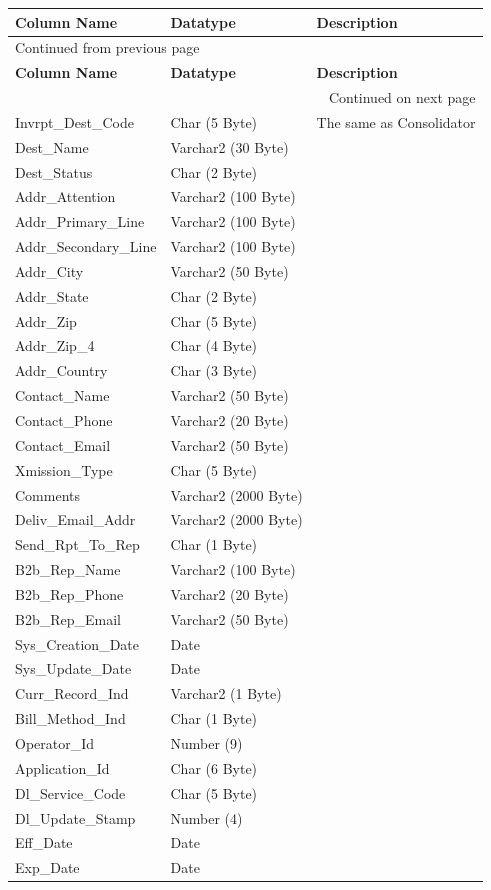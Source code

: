 \documentclass[12pt,twoside]{article}
\begin{document}
\begin{longtable}{l|l|l}
\hline
\textbf{Column Name} & \textbf{Datatype} & \textbf{Description}\\
\hline
\endfirsthead
\multicolumn{3}{l}{Continued from previous page} \\
\hline

\textbf{Column Name} & \textbf{Datatype} & \textbf{Description} \\

\hline
\endhead
\hline\multicolumn{3}{r}{Continued on next page} \\
\endfoot
\endlastfoot
\hline
Invrpt\_Dest\_Code & Char (5 Byte) & The same as Consolidator\\
Dest\_Name & Varchar2 (30 Byte) & \\
Dest\_Status & Char (2 Byte) & \\
Addr\_Attention & Varchar2 (100 Byte) & \\
Addr\_Primary\_Line & Varchar2 (100 Byte) & \\
Addr\_Secondary\_Line & Varchar2 (100 Byte) & \\
Addr\_City & Varchar2 (50 Byte) & \\
Addr\_State & Char (2 Byte) & \\
Addr\_Zip & Char (5 Byte) & \\
Addr\_Zip\_4 & Char (4 Byte) & \\
Addr\_Country & Char (3 Byte) & \\
Contact\_Name & Varchar2 (50 Byte) & \\
Contact\_Phone & Varchar2 (20 Byte) & \\
Contact\_Email & Varchar2 (50 Byte) & \\
Xmission\_Type & Char (5 Byte) & \\
Comments & Varchar2 (2000 Byte) & \\
Deliv\_Email\_Addr & Varchar2 (2000 Byte) & \\
Send\_Rpt\_To\_Rep & Char (1 Byte) & \\
B2b\_Rep\_Name & Varchar2 (100 Byte) & \\
B2b\_Rep\_Phone & Varchar2 (20 Byte) & \\
B2b\_Rep\_Email & Varchar2 (50 Byte) & \\
Sys\_Creation\_Date & Date & \\
Sys\_Update\_Date & Date & \\
Curr\_Record\_Ind & Varchar2 (1 Byte) & \\
Bill\_Method\_Ind & Char (1 Byte) & \\
Operator\_Id & Number (9) & \\
Application\_Id & Char (6 Byte) & \\
Dl\_Service\_Code & Char (5 Byte) & \\
Dl\_Update\_Stamp & Number (4) & \\
Eff\_Date & Date & \\
Exp\_Date & Date & \\
\hline
\end{longtable}
\normalsize
\end{document}
